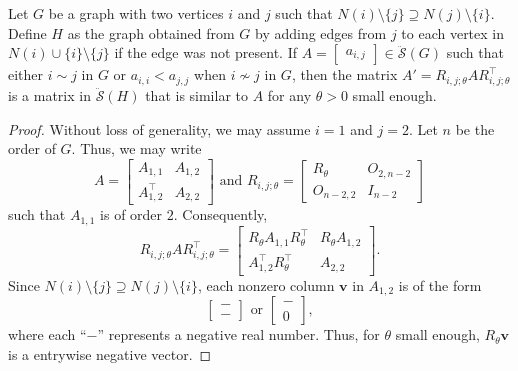 \documentclass[10pt,a4paper]{amsart}
\newcommand{\bv}{\mathbf{v}}
\newcommand{\mdso}{\ddot{\mathcal{S}}}
\newcommand{\trans}{^\top}
\begin{document}
\begin{lemma}
\label{lem:givens}
Let $G$ be a graph with two vertices $i$ and $j$ such that $N(i)\setminus\{j\} \supseteq N(j)\setminus\{i\}$.  Define $H$ as the graph obtained from $G$ by adding edges from $j$ to each vertex in $N(i)\cup\{i\}\setminus\{j\}$ if the edge was not present.  If $A = \begin{bmatrix} a_{i,j} \end{bmatrix} \in \mdso(G)$ such that either $i \sim j$ in $G$ or $a_{i,i} < a_{j,j}$ when $i \nsim j$ in $G$, then the matrix $A' = R_{i,j;\theta} A R_{i,j;\theta}\trans$ is a matrix in $\mdso(H)$ that is similar to $A$ for any $\theta > 0$ small enough.
\end{lemma}

\begin{proof}
Without loss of generality, we may assume $i = 1$ and $j = 2$.  Let $n$ be the order of $G$.  Thus, we may write 
\[
    A = \begin{bmatrix}
        A_{1,1} & A_{1,2} \\
        A_{1,2}\trans & A_{2,2}
    \end{bmatrix}
    \text{ and }
    R_{i,j;\theta} = \begin{bmatrix}
        R_\theta & O_{2,n-2} \\
        O_{n-2,2} & I_{n-2}
    \end{bmatrix}
\]
such that $A_{1,1}$ is of order $2$.  Consequently, 
\[
    R_{i,j;\theta} A R_{i,j;\theta}\trans = \begin{bmatrix}
        R_\theta A_{1,1} R_\theta\trans & R_\theta A_{1,2} \\
        A_{1,2}\trans R_\theta\trans & A_{2,2}
    \end{bmatrix}.
\]
Since $N(i)\setminus\{j\} \supseteq N(j)\setminus\{i\}$, each nonzero column $\bv$ in $A_{1,2}$ is of the form
\[
    \begin{bmatrix} - \\ - \end{bmatrix}
    \text{ or } 
    \begin{bmatrix} - \\ 0 \end{bmatrix},
\] where each ``$-$'' represents a negative real number.
Thus, for $\theta$ small enough, $R_\theta \bv$ is a entrywise negative vector.  


\end{proof}
\end{document}
